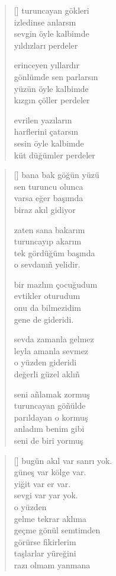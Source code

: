 \documentclass[a5paper, openright, twoside]{memoir}
\begin{document}
\begin{verse}[\versewidth]
  turuncayan gökleri \\
  izledinse anlarsın \\
  sevgin öyle kalbimde \\
  yıldızları perdeler

  erinceyen yıllardır \\
  gönlümde sen parlarsın \\
  yüzün öyle kalbimde \\
  kızgın çöller perdeler

  evrilen yazıların \\
  harflerini çatarsın \\
  sesin öyle kalbimde \\
  küt düğümler perdeler
\end{verse}
\begin{verse}[\versewidth]
  bana bak göğün yüzü \\
  sen turuncu olunca \\
  varsa eğer başımda \\
  biraz akıl gidiyor

  zaten sana bakarım \\
  turuncayıp akarım \\
  tek gördüğüm başında \\
  o sevdanı\~n yelidir.

  bir mazlım çocuğudum \\
  evtikler oturudum \\
  onu da bilmezidim \\
  gene de gideridi.

  sevda zamanla gelmez \\
  leyla amanla sevmez \\
  o yüzden gideridi \\
  değerli güzel aklı\~n

  seni a\~nlamak zormuş \\
  turuncayan gö\~nülde \\
  parıldayan o kormuş \\
  anladım benim gibi \\
  seni de biri yormuş
\end{verse}
\begin{verse}[\versewidth]
  bugün akıl var sanrı yok. \\
  güneş var kölge var. \\
  yiğit var er var. \\
  sevgi var yar yok. \\
  o yüzden  \\
  gelme tekrar aklıma \\
  geçme gönül semtimden \\
  görürse fikirlerim \\
  taşlarlar yüreğini \\
  razı olmam yanmana
\end{verse}
\end{document}
